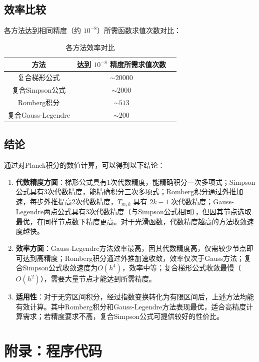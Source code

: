 \documentclass{article}
\begin{document}
\subsection{效率比较}

各方法达到相同精度（约 \(10^{-8}\)）所需函数求值次数对比：

\begin{table}[H]
\centering
\caption{各方法效率对比}
\begin{tabular}{ccc}
\toprule
方法 & 达到 $10^{-8}$ 精度所需求值次数 \\
\midrule
复合梯形公式 & $\sim 20000$\\
复合Simpson公式 & $\sim 2000$\\
Romberg积分 & $\sim 513$\\
复合Gauss-Legendre & $\sim 200$\\
\bottomrule
\end{tabular}
\end{table}

\subsection{结论}

通过对Planck积分的数值计算，可以得到以下结论：

\begin{enumerate}
    \item \textbf{代数精度方面}：梯形公式具有1次代数精度，能精确积分一次多项式；Simpson公式具有3次代数精度，能精确积分三次多项式；Romberg积分通过外推加速，每步外推提高2次代数精度，$T_{m,k}$ 具有 $2k-1$ 次代数精度；Gauss-Legendre两点公式具有3次代数精度（与Simpson公式相同），但因其节点选取最优，在同样节点数下精度更高。对于光滑函数，代数精度越高的方法收敛速度越快。
    
    \item \textbf{效率方面}：Gauss-Legendre方法效率最高，因其代数精度高，仅需较少节点即可达到高精度；Romberg积分通过外推加速收敛，效率仅次于Gauss方法；复合Simpson公式收敛速度为$O(h^4)$，效率中等；复合梯形公式收敛最慢（$O(h^2)$），需要大量节点才能达到所需精度。
    
    \item \textbf{适用性}：对于无穷区间积分，经过指数变换转化为有限区间后，上述方法均能有效计算。其中Romberg积分和Gauss-Legendre方法表现最优，适合高精度计算需求；若精度要求不高，复合Simpson公式可提供较好的性价比。
\end{enumerate}
\section{附录：程序代码}
\end{document}
